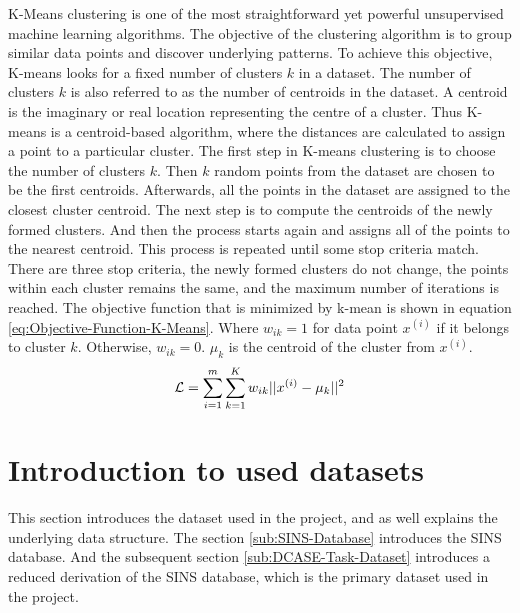 K-Means clustering is one of the most straightforward yet powerful unsupervised machine learning algorithms. The objective of the clustering algorithm is to group similar data points and discover underlying patterns. To achieve this objective, K-means looks for a fixed number of clusters $k$ in a dataset. The number of clusters $k$ is also referred to as the number of centroids in the dataset. A centroid is the imaginary or real location representing the centre of a cluster. Thus K-means is a centroid-based algorithm, where the distances are calculated to assign a point to a particular cluster.
\newline
\newline
The first step in K-means clustering is to choose the number of clusters $k$. Then $k$ random points from the dataset are chosen to be the first centroids. Afterwards, all the points in the dataset are assigned to the closest cluster centroid. The next step is to compute the centroids of the newly formed clusters. And then the process starts again and assigns all of the points to the nearest centroid. This process is repeated until some stop criteria match. There are three stop criteria, the newly formed clusters do not change, the points within each cluster remains the same, and the maximum number of iterations is reached. The objective function that is minimized by k-mean is shown in equation \ref{eq:Objective-Function-K-Means}. Where $w_{ik} = 1$ for data point $x^{(i)}$ if it belongs to cluster $k$. Otherwise, $w_{ik} = 0$. $\mu_k$ is the centroid of the cluster from $x^{(i)}$.
\begin{equation}
    \centering
    \begin{gathered}
        \mathcal{L} = \sum_{i=1}^m\sum_{k=1}^K w_{ik} || x^{(i)} - \mu_k ||^2
    \end{gathered}
    \label{eq:Objective-Function-K-Means}
\end{equation}

\section{Introduction to used datasets}
\label{sec:Introduction-Used-Datasets}
This section introduces the dataset used in the project, and as well explains the underlying data structure. The section \ref{sub:SINS-Database} introduces the \gls{SINS} database. And the subsequent section \ref{sub:DCASE-Task-Dataset} introduces a reduced derivation of the \gls{SINS} database, which is the primary dataset used in the project.

